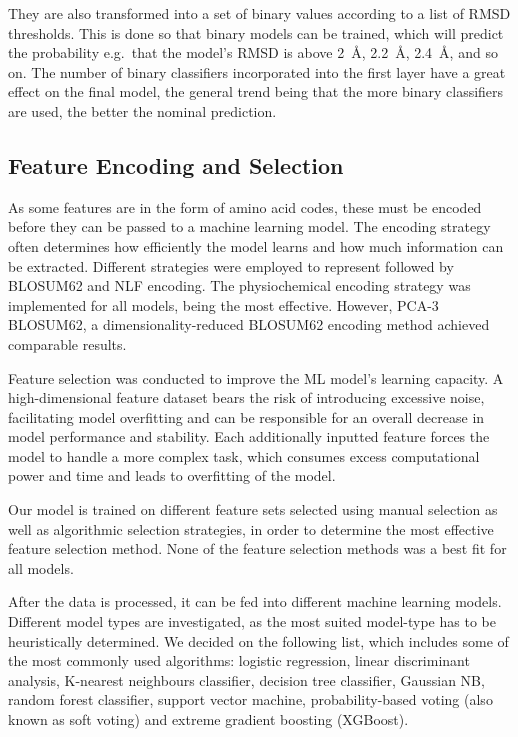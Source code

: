 \documentclass[12pt]{article}
\begin{document}
They are also transformed into a set of binary values according to a
list of RMSD thresholds. This is done so that binary models can be
trained, which will predict the probability e.g.\ that the model's RMSD
is above 2~\AA, 2.2~\AA, 2.4~\AA, and so on. The number of binary
classifiers incorporated into the first layer have a great effect on
the final model, the general trend being that the more binary
classifiers are used, the better the nominal prediction.

\subsection{Feature Encoding and Selection}

As some features are in the form of amino acid codes, these must be
encoded before they can be passed to a machine learning model. The
encoding strategy often determines how efficiently the model learns
and how much information can be extracted. Different strategies were
employed to represent followed by BLOSUM62 and NLF encoding. The
physiochemical encoding strategy was implemented for all models, being
the most effective. However, PCA-3 BLOSUM62, a dimensionality-reduced
BLOSUM62 encoding method achieved comparable results.

Feature selection was conducted to improve the ML model's learning
capacity. A high-dimensional feature dataset bears the risk of
introducing excessive noise, facilitating model overfitting and can be
responsible for an overall decrease in model performance and
stability. Each additionally inputted feature forces the model to
handle a more complex task, which consumes excess computational power
and time and leads to overfitting of the model.

Our model is trained on different feature sets selected using manual
selection as well as algorithmic selection strategies, in order to
determine the most effective feature selection method. None of the
feature selection methods was a best fit for all models.

After the data is processed, it can be fed into different machine
learning models. Different model types are investigated, as the most
suited model-type has to be heuristically determined. We decided on
the following list, which includes some of the most commonly used
algorithms: logistic regression, linear discriminant analysis,
K-nearest neighbours classifier, decision tree classifier, Gaussian
NB, random forest classifier, support vector machine,
probability-based voting (also known as soft voting) and extreme
gradient boosting (XGBoost)\cite{Chen2016}.
\end{document}
